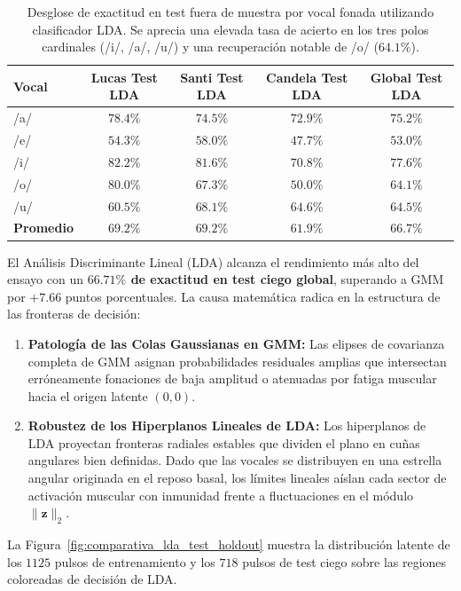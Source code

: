 \documentclass[11pt,a4paper,openany]{book}
\theoremstyle{definition}
\begin{document}
\begin{table}[H]
\centering
\small
\begin{tabular}{lcccc}
\hline
\textbf{Vocal} & \textbf{Lucas Test LDA} & \textbf{Santi Test LDA} & \textbf{Candela Test LDA} & \textbf{Global Test LDA} \\
\hline
/a/ & $78.4\%$ & $74.5\%$ & $72.9\%$ & $\mathbf{75.2\%}$ \\
/e/ & $54.3\%$ & $58.0\%$ & $47.7\%$ & $\mathbf{53.0\%}$ \\
/i/ & $82.2\%$ & $81.6\%$ & $70.8\%$ & $\mathbf{77.6\%}$ \\
/o/ & $80.0\%$ & $67.3\%$ & $50.0\%$ & $\mathbf{64.1\%}$ \\
/u/ & $60.5\%$ & $68.1\%$ & $64.6\%$ & $\mathbf{64.5\%}$ \\
\hline
\textbf{Promedio} & $\mathbf{69.2\%}$ & $\mathbf{69.2\%}$ & $\mathbf{61.9\%}$ & $\mathbf{66.7\%}$ \\
\hline
\end{tabular}
\caption{Desglose de exactitud en test fuera de muestra por vocal fonada utilizando clasificador LDA. Se aprecia una elevada tasa de acierto en los tres polos cardinales (/i/, /a/, /u/) y una recuperación notable de /o/ ($64.1\%$).}
\label{tab:desglose_vocales_lda_test}
\end{table}

El Análisis Discriminante Lineal (LDA) alcanza el rendimiento más alto del ensayo con un \textbf{$66.71\%$ de exactitud en test ciego global}, superando a GMM por $+7.66$ puntos porcentuales. La causa matemática radica en la estructura de las fronteras de decisión:
\begin{enumerate}
    \item \textbf{Patología de las Colas Gaussianas en GMM:} Las elipses de covarianza completa de GMM asignan probabilidades residuales amplias que intersectan erróneamente fonaciones de baja amplitud o atenuadas por fatiga muscular hacia el origen latente $(0,0)$.
    \item \textbf{Robustez de los Hiperplanos Lineales de LDA:} Los hiperplanos de LDA proyectan fronteras radiales estables que dividen el plano en cuñas angulares bien definidas. Dado que las vocales se distribuyen en una estrella angular originada en el reposo basal, los límites lineales aíslan cada sector de activación muscular con inmunidad frente a fluctuaciones en el módulo $\|\mathbf{z}\|_2$.
\end{enumerate}

La Figura~\ref{fig:comparativa_lda_test_holdout} muestra la distribución latente de los $1125$ pulsos de entrenamiento y los $718$ pulsos de test ciego sobre las regiones coloreadas de decisión de LDA.
\end{document}
